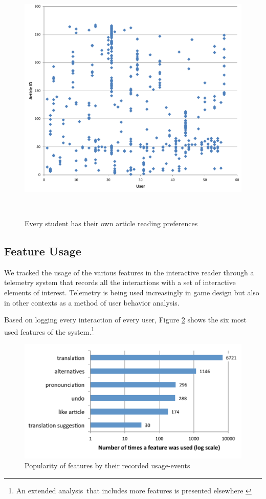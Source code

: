 \begin{figure}[h!]
\centering
  \includegraphics[width=\columnwidth]{figures/users_articles}
  \caption{Every student has their own article reading preferences}~\label{fig:articles_read}
\end{figure}

\subsection{Feature Usage}
\newcommand{\feature}[1]{{\em #1}}
We tracked the usage of the various features in the interactive reader through a telemetry system that records all the interactions with a set of interactive elements of interest. Telemetry is being used increasingly in game design \cite{Gagne11-telemetry} but also in other contexts as a method of user behavior analysis. 

Based on logging every interaction of every user, Figure \ref{fig:feature_usage} shows the six most used features of the system.\footnote{An extended analysis that includes more features is presented elsewhere \cite{Chirtoaca17-apollo}}

  \begin{figure}[h!]
  \centering
    \includegraphics[width=0.9\columnwidth]{figures/reader_feature_usage}
    \caption{Popularity of features by their recorded usage-events}
    \label{fig:feature_usage}
  \end{figure}

